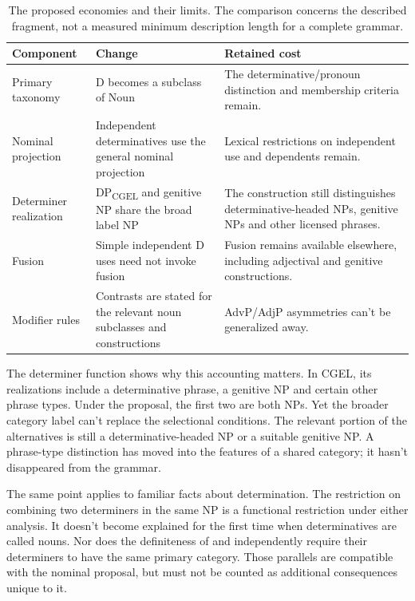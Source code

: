 \documentclass[12pt]{article}
\begin{document}
\begin{table}[tb]
\centering\small
\caption{The proposed economies and their limits. The comparison concerns the described fragment, not a measured minimum description length for a complete grammar.}\label{tab:economy}
\begin{tabular}{p{2.5cm}p{4.5cm}p{4.9cm}}
\toprule
Component & Change & Retained cost \\
\midrule
Primary taxonomy & D becomes a subclass of Noun & The determinative/pronoun distinction and membership criteria remain. \\
Nominal projection & Independent determinatives use the general nominal projection & Lexical restrictions on independent use and dependents remain. \\
Determiner realization & DP\textsubscript{CGEL} and genitive NP share the broad label NP & The construction still distinguishes determinative-headed NPs, genitive NPs and other licensed phrases. \\
Fusion & Simple independent D uses need not invoke fusion & Fusion remains available elsewhere, including adjectival and genitive constructions. \\
Modifier rules & Contrasts are stated for the relevant noun subclasses and constructions & AdvP/AdjP asymmetries can't be generalized away. \\
\bottomrule
\end{tabular}
\end{table}

The determiner function shows why this accounting matters. In CGEL, its realizations include a determinative phrase, a genitive NP and certain other phrase types. Under the proposal, the first two are both NPs. Yet the broader category label can't replace the selectional conditions. The relevant portion of the alternatives is still a determinative-headed NP or a suitable genitive NP. A phrase-type distinction has moved into the features of a shared category; it hasn't disappeared from the grammar.

The same point applies to familiar facts about determination. The restriction on combining two determiners in the same NP is a functional restriction under either analysis. It doesn't become explained for the first time when determinatives are called nouns. Nor does the definiteness of  and  independently require their determiners to have the same primary category. Those parallels are compatible with the nominal proposal, but must not be counted as additional consequences unique to it.
\end{document}
